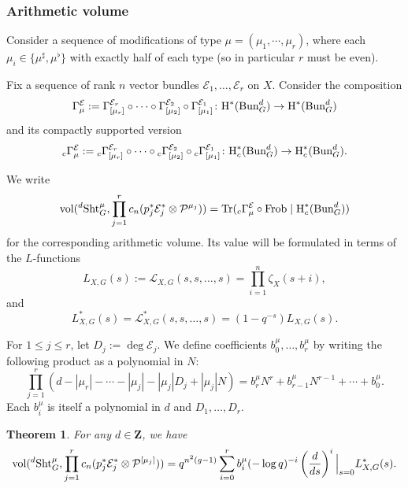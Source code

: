 \documentclass[reqno]{amsart}
\numberwithin{equation}{subsection}
\newtheorem{theorem}[subsubsection]{Theorem}
\theoremstyle{definition}
\newcommand\cE{\mathcal{E}}
\newcommand\cP{\mathcal{P}}
\newcommand{\sL}{{\mathscr{L}}}
\newcommand{\Bun}{\textup{Bun}}
\newcommand\Frob{\textup{Frob}}
\newcommand\Sht{\textup{Sht}}
\newcommand{\Tr}{\textup{Tr}}
\newcommand{\vol}{\textup{vol}}
\newcommand\ot{\otimes}
\renewcommand\c\circ
\newcommand{\cohog}[2]{\textup{H}^{#1}({#2})}     %
\newcommand{\cohoc}[2]{\textup{H}_{c}^{#1}({#2})}     %
\newcommand\G\Gamma
\newcommand{\z}{\zeta}
\newcommand{\Z}{\mathbf{Z}}
\newcommand{\co}{\colon}
\begin{document}
\subsubsection{Arithmetic volume}
Consider a sequence of modifications of type $\mu =(\mu_1,\cdots ,\mu_{r})$, where each $\mu_i \in \{\mu^\sharp, \mu^\flat\}$ with exactly half of each type (so in particular $r$ must be even). 


Fix a sequence of rank $n$ vector bundles $\cE_1, \ldots, \cE_r$ on $X$. Consider the composition
\begin{equation*}
\G_{\mu}^{\cE}:= \G_{[\mu_{r}]}^{\cE_{r}}\c\cdots\c\G_{[\mu_{2}]}^{\cE_{2}}\c\G_{[\mu_{1}]}^{\cE_{1}} \co \cohog{*}{\Bun^{d}_{G}}\to \cohog{*}{\Bun^{d}_{G}}
\end{equation*}
and its compactly supported version
\begin{equation*}
{}_{c}\G_{\mu}^{\cE} := {}_{c}\G_{[\mu_{r}]}^{\cE_{r}}\c\cdots\c {}_{c}\G_{[\mu_{2}]}^{\cE_{2}}\c {}_{c}\G_{[\mu_{1}]}^{\cE_{1}} \co \cohoc{*}{\Bun^{d}_{G}}\to \cohoc{*}{\Bun^{d}_{G}}.
\end{equation*}

We write
\[
\vol({}^{d}\Sht^{\mu}_{G}, \prod_{j=1}^{r}c_{n}(p_{j}^{*}\cE^{*}_{j}\ot\cP^{\mu_{j}})) = \Tr({}_{c}\G_{\mu}^{\cE}\circ\Frob\mid  \cohoc{*}{\Bun^{d}_{G}})
\]
for the corresponding arithmetic volume. Its value will be formulated in terms of the $L$-functions
\begin{equation}\label{eq:split-L}
L_{X,G}(s) := \sL_{X,G}(s, s, \ldots, s) =  \prod_{i=1}^{n}\z_{X}(s+i),
\end{equation}
and
\begin{equation}\label{eq:split-normalized-L}
L^{*}_{X,G}(s)= \sL^{*}_{X,G}(s, s, \ldots, s) =  (1-q^{-s})L_{X,G}(s).
\end{equation}

For $1 \leq j \leq r$, let $D_j := \deg \cE_j$. We define coefficients $b_0^\mu, \ldots, b_r^\mu$ by writing the following product as a polynomial in $N$:
\begin{equation}\label{def bmuj}
\prod_{j=1}^{r}(d-|\mu_{r}|-\cdots-|\mu_{j}|- |\mu_j| D_{j}+ |\mu_j| N)=b^{\mu}_{r}N^{r}+b^{\mu}_{r-1}N^{r-1}+\cdots+b^{\mu}_{0}.
\end{equation}
Each $b^{\mu}_{i}$ is itself a polynomial in $d$ and $D_1, \ldots, D_r$. 

\begin{theorem}\label{th:main GLn} For any $d\in \Z$, we have
\begin{equation*}
\vol({}^{d}\Sht^{\mu}_{G}, \prod_{j=1}^{r}c_{n}(p_{j}^{*}\cE^{*}_{j}\ot\cP^{[\mu_{j}]}))=q^{n^{2}(g-1)}\sum_{i=0}^{r}b^{\mu}_{i}(-\log q)^{-i}\left(\frac{d}{ds}\right)^{i}\Big|_{s=0}L^{*}_{X,G}(s).
\end{equation*}
\end{theorem}
\end{document}
